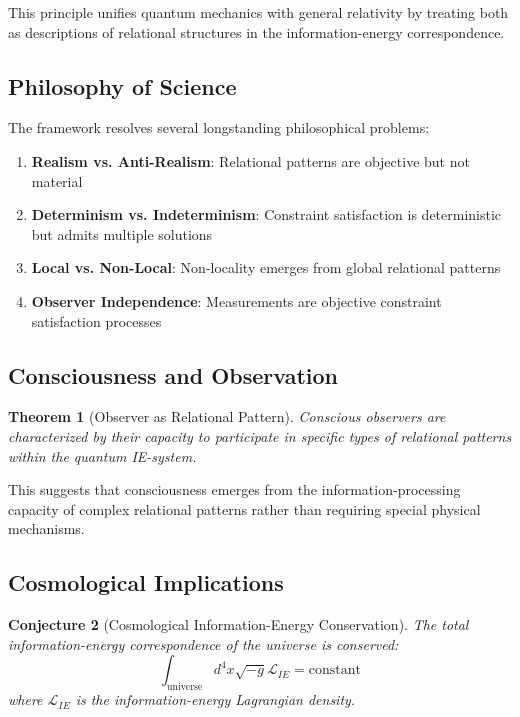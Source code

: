 \documentclass[12pt,a4paper]{article}
\newtheorem{theorem}{Theorem}[section]
\newtheorem{conjecture}[theorem]{Conjecture}
\begin{document}
This principle unifies quantum mechanics with general relativity by treating both as descriptions of relational structures in the information-energy correspondence.

\subsection{Philosophy of Science}

The framework resolves several longstanding philosophical problems:
\begin{enumerate}
\item \textbf{Realism vs. Anti-Realism}: Relational patterns are objective but not material
\item \textbf{Determinism vs. Indeterminism}: Constraint satisfaction is deterministic but admits multiple solutions
\item \textbf{Local vs. Non-Local}: Non-locality emerges from global relational patterns
\item \textbf{Observer Independence}: Measurements are objective constraint satisfaction processes
\end{enumerate}

\subsection{Consciousness and Observation}

\begin{theorem}[Observer as Relational Pattern]
Conscious observers are characterized by their capacity to participate in specific types of relational patterns within the quantum IE-system.
\end{theorem}

This suggests that consciousness emerges from the information-processing capacity of complex relational patterns rather than requiring special physical mechanisms.

\subsection{Cosmological Implications}

\begin{conjecture}[Cosmological Information-Energy Conservation]
The total information-energy correspondence of the universe is conserved:
\[
\int_{\text{universe}} d^4x \sqrt{-g} \mathcal{L}_{IE} = \text{constant}
\]
where $\mathcal{L}_{IE}$ is the information-energy Lagrangian density.
\end{conjecture}
\end{document}
